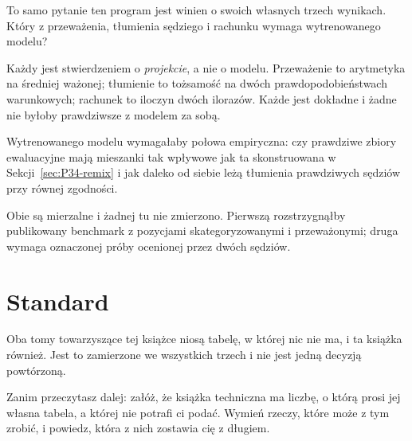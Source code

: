 \begin{fr}
To samo pytanie ten program jest winien o swoich własnych trzech wynikach.
Który z przeważenia, tłumienia sędziego i rachunku wymaga wytrenowanego
modelu?
\dotline
\nextframe
\end{fr}

\begin{fr}

Każdy jest stwierdzeniem o \emph{projekcie}, a nie o modelu. Przeważenie to
arytmetyka na średniej ważonej; tłumienie to tożsamość na dwóch
prawdopodobieństwach warunkowych; rachunek to iloczyn dwóch ilorazów. Każde
jest dokładne i żadne nie byłoby prawdziwsze z modelem za sobą.

\begin{warning}
Wytrenowanego modelu wymagałaby połowa empiryczna: czy prawdziwe zbiory
ewaluacyjne mają mieszanki tak wpływowe jak ta skonstruowana w
Sekcji~\ref{sec:P34-remix} i jak daleko od siebie leżą tłumienia prawdziwych
sędziów przy równej zgodności.

Obie są mierzalne i żadnej tu nie zmierzono. Pierwszą rozstrzygnąłby
publikowany benchmark z pozycjami skategoryzowanymi i przeważonymi; druga
wymaga oznaczonej próby ocenionej przez dwóch sędziów.
\end{warning}
\end{fr}

\section{Standard}
\label{sec:P34-standard}

\begin{fr}
Oba tomy towarzyszące tej książce niosą tabelę, w której nic nie ma, i ta
książka również. Jest to zamierzone we wszystkich trzech i nie jest jedną
decyzją powtórzoną.

Zanim przeczytasz dalej: załóż, że książka techniczna ma liczbę, o którą
prosi jej własna tabela, a której nie potrafi ci podać. Wymień rzeczy, które
może z tym zrobić, i powiedz, która z nich zostawia cię z długiem.
\dotline
\nextframe
\end{fr}

